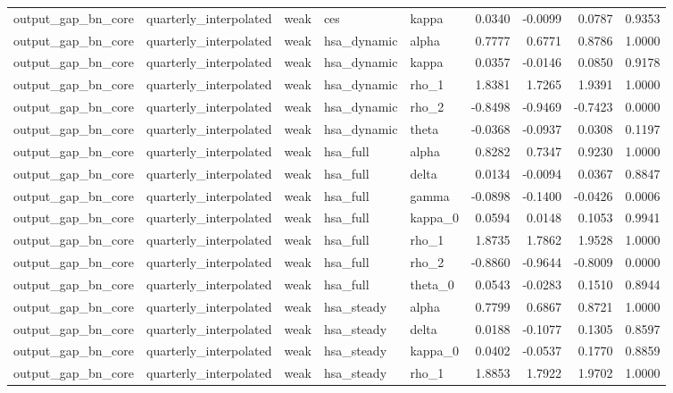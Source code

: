 \begin{tabular}{lllllrrrr}
output\_gap\_bn\_core & quarterly\_interpolated & weak & ces & kappa & 0.0340 & -0.0099 & 0.0787 & 0.9353 \\
output\_gap\_bn\_core & quarterly\_interpolated & weak & hsa\_dynamic & alpha & 0.7777 & 0.6771 & 0.8786 & 1.0000 \\
output\_gap\_bn\_core & quarterly\_interpolated & weak & hsa\_dynamic & kappa & 0.0357 & -0.0146 & 0.0850 & 0.9178 \\
output\_gap\_bn\_core & quarterly\_interpolated & weak & hsa\_dynamic & rho\_1 & 1.8381 & 1.7265 & 1.9391 & 1.0000 \\
output\_gap\_bn\_core & quarterly\_interpolated & weak & hsa\_dynamic & rho\_2 & -0.8498 & -0.9469 & -0.7423 & 0.0000 \\
output\_gap\_bn\_core & quarterly\_interpolated & weak & hsa\_dynamic & theta & -0.0368 & -0.0937 & 0.0308 & 0.1197 \\
output\_gap\_bn\_core & quarterly\_interpolated & weak & hsa\_full & alpha & 0.8282 & 0.7347 & 0.9230 & 1.0000 \\
output\_gap\_bn\_core & quarterly\_interpolated & weak & hsa\_full & delta & 0.0134 & -0.0094 & 0.0367 & 0.8847 \\
output\_gap\_bn\_core & quarterly\_interpolated & weak & hsa\_full & gamma & -0.0898 & -0.1400 & -0.0426 & 0.0006 \\
output\_gap\_bn\_core & quarterly\_interpolated & weak & hsa\_full & kappa\_0 & 0.0594 & 0.0148 & 0.1053 & 0.9941 \\
output\_gap\_bn\_core & quarterly\_interpolated & weak & hsa\_full & rho\_1 & 1.8735 & 1.7862 & 1.9528 & 1.0000 \\
output\_gap\_bn\_core & quarterly\_interpolated & weak & hsa\_full & rho\_2 & -0.8860 & -0.9644 & -0.8009 & 0.0000 \\
output\_gap\_bn\_core & quarterly\_interpolated & weak & hsa\_full & theta\_0 & 0.0543 & -0.0283 & 0.1510 & 0.8944 \\
output\_gap\_bn\_core & quarterly\_interpolated & weak & hsa\_steady & alpha & 0.7799 & 0.6867 & 0.8721 & 1.0000 \\
output\_gap\_bn\_core & quarterly\_interpolated & weak & hsa\_steady & delta & 0.0188 & -0.1077 & 0.1305 & 0.8597 \\
output\_gap\_bn\_core & quarterly\_interpolated & weak & hsa\_steady & kappa\_0 & 0.0402 & -0.0537 & 0.1770 & 0.8859 \\
output\_gap\_bn\_core & quarterly\_interpolated & weak & hsa\_steady & rho\_1 & 1.8853 & 1.7922 & 1.9702 & 1.0000 \\

\end{tabular}
